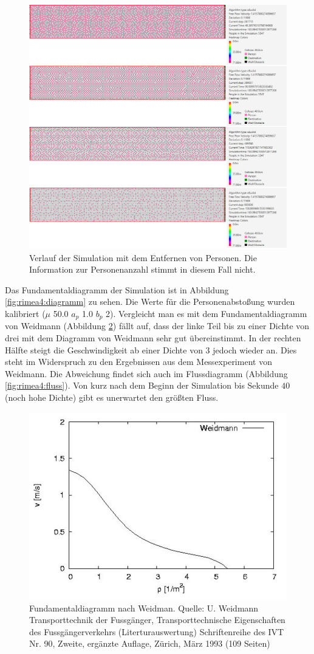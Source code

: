 \begin{figure}
	\centering
	\includegraphics[width=0.7\linewidth]{abbildungen/fundamentaldiagramm/verlauf}
	\caption{Verlauf der Simulation mit dem Entfernen von Personen. Die Information zur Personenanzahl stimmt in diesem Fall nicht.}
	\label{fig:rimea4:verlauf}
\end{figure}

Das Fundamentaldiagramm der Simulation ist in Abbildung \ref{fig:rimea4:diagramm} zu sehen. Die Werte für die Personenabstoßung wurden kalibriert ($\mu$ 50.0 $a_p$ 1.0 $b_p$ 2). Vergleicht man es mit dem Fundamentaldiagramm von Weidmann (Abbildung \ref{fig:rimea4:weidman}) fällt auf, dass der linke Teil bis zu einer Dichte von drei mit dem Diagramm von Weidmann sehr gut übereinstimmt. In der rechten Hälfte steigt die Geschwindigkeit ab einer Dichte von 3 jedoch wieder an. Dies steht im Widerspruch zu den Ergebnissen aus dem Messexperiment von Weidmann. Die Abweichung findet sich auch im Flussdiagramm (Abbildung \ref{fig:rimea4:fluss}). Von kurz nach dem Beginn der Simulation bis Sekunde $40$ (noch hohe Dichte) gibt es unerwartet den größten Fluss.

\begin{figure}
	\centering
	\includegraphics[width=0.7\linewidth]{abbildungen/fundamentaldiagramm/weidman}
	\caption{Fundamentaldiagramm nach Weidman. Quelle: U. Weidmann Transporttechnik der Fussgänger, Transporttechnische Eigenschaften des Fussgängerverkehrs (Literturauswertung) Schriftenreihe des IVT Nr. 90, Zweite, ergänzte Auflage, Zürich, März 1993 (109 Seiten)}
	\label{fig:rimea4:weidman}
\end{figure}

